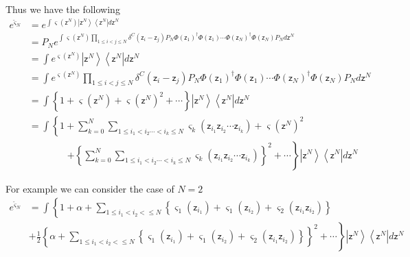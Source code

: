 \documentclass[aps,preprint]{revtex4}%
\begin{document}
Thus we have the following
\begin{align}
e^{\breve{\varsigma}_{N}} &  =e^{\int\varsigma\left(  \mathsf{z}^{N}\right)
\left\vert \mathsf{z}^{N}\right\rangle \left\langle \mathsf{z}^{N}\right\vert
d\mathsf{z}^{N}}\nonumber\\
&  =P_{N}e^{\int\varsigma\left(  \mathsf{z}^{N}\right)  \prod_{1\leq i<j\leq
N}\delta^{C}\left(  \mathsf{z}_{i}-\mathsf{z}_{j}\right)  P_{N}\Phi\left(
\mathsf{z}_{1}\right)  ^{\dagger}\Phi\left(  \mathsf{z}_{1}\right)  \cdots
\Phi\left(  \mathsf{z}_{N}\right)  ^{\dagger}\Phi\left(  \mathsf{z}%
_{N}\right)  P_{N}d\mathsf{z}^{N}}\nonumber\\
&  =\int e^{\varsigma\left(  \mathsf{z}^{N}\right)  }\left\vert \mathsf{z}%
^{N}\right\rangle \left\langle \mathsf{z}^{N}\right\vert d\mathsf{z}%
^{N}\nonumber\\
&  =\int e^{\varsigma\left(  \mathsf{z}^{N}\right)  }\prod_{1\leq i<j\leq
N}\delta^{C}\left(  \mathsf{z}_{i}-\mathsf{z}_{j}\right)  P_{N}\Phi\left(
\mathsf{z}_{1}\right)  ^{\dagger}\Phi\left(  \mathsf{z}_{1}\right)  \cdots
\Phi\left(  \mathsf{z}_{N}\right)  ^{\dagger}\Phi\left(  \mathsf{z}%
_{N}\right)  P_{N}d\mathsf{z}^{N}\nonumber\\
&  =\int\left\{  1+\varsigma\left(  \mathsf{z}^{N}\right)  +\varsigma\left(
\mathsf{z}^{N}\right)  ^{2}+\cdots\right\}  \left\vert \mathsf{z}%
^{N}\right\rangle \left\langle \mathsf{z}^{N}\right\vert d\mathsf{z}%
^{N}\nonumber\\
&  =\int\left\{  1+\sum_{k=0}^{N}\sum_{1\leq i_{1}<i_{2}\cdots<i_{k}\leq
N}\varsigma_{k}\left(  \mathsf{z}_{i_{1}}\mathsf{z}_{i_{2}}\cdots
\mathsf{z}_{i_{k}}\right)  +\varsigma\left(  \mathsf{z}^{N}\right)
^{2}\right.  \nonumber\\
&  \qquad\qquad\left.  +\left\{  \sum_{k=0}^{N}\sum_{1\leq i_{1}<i_{2}%
\cdots<i_{k}\leq N}\varsigma_{k}\left(  \mathsf{z}_{i_{1}}\mathsf{z}_{i_{2}%
}\cdots\mathsf{z}_{i_{k}}\right)  \right\}  ^{2}+\cdots\right\}  \left\vert
\mathsf{z}^{N}\right\rangle \left\langle \mathsf{z}^{N}\right\vert
d\mathsf{z}^{N}%
\end{align}


For example we can consider the case of $N=2$
\begin{align}
e^{\breve{\varsigma}_{N}}  & =\int\left\{  1+\alpha+\sum_{1\leq i_{1}%
<i_{2}<\leq N}\left\{  \varsigma_{1}\left(  \mathsf{z}_{i_{1}}\right)
+\varsigma_{1}\left(  \mathsf{z}_{i_{2}}\right)  +\varsigma_{2}\left(
\mathsf{z}_{i_{1}}\mathsf{z}_{i_{2}}\right)  \right\}  \right.  \nonumber\\
& \left.  +\frac{1}{2}\left\{  \alpha+\sum_{1\leq i_{1}<i_{2}<\leq N}\left\{
\varsigma_{1}\left(  \mathsf{z}_{i_{1}}\right)  +\varsigma_{1}\left(
\mathsf{z}_{i_{2}}\right)  +\varsigma_{2}\left(  \mathsf{z}_{i_{1}}%
\mathsf{z}_{i_{2}}\right)  \right\}  \right\}  ^{2}+\cdots\right\}  \left\vert
\mathsf{z}^{N}\right\rangle \left\langle \mathsf{z}^{N}\right\vert
d\mathsf{z}^{N}%
\end{align}
\end{document}

